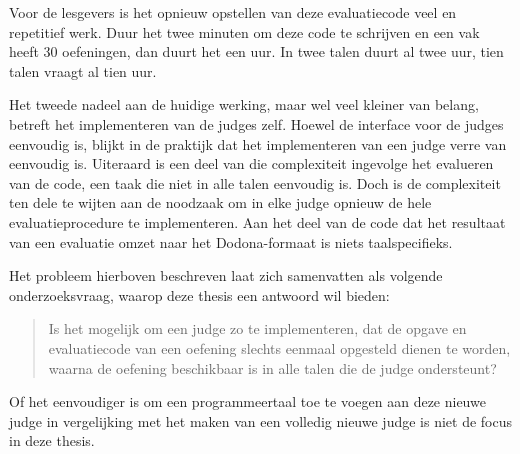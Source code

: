 Voor de lesgevers is het opnieuw opstellen van deze evaluatiecode veel en repetitief werk.
Duur het twee minuten om deze code te schrijven en een vak heeft 30 oefeningen, dan duurt het een uur.
In twee talen duurt al twee uur, tien talen vraagt al tien uur.

Het tweede nadeel aan de huidige werking, maar wel veel kleiner van belang, betreft het implementeren van de judges zelf.
Hoewel de interface voor de judges eenvoudig is, blijkt in de praktijk dat het implementeren van een judge verre van eenvoudig is.
Uiteraard is een deel van die complexiteit ingevolge het evalueren van de code, een taak die niet in alle talen eenvoudig is.
Doch is de complexiteit ten dele te wijten aan de noodzaak om in elke judge opnieuw de hele evaluatieprocedure te implementeren.
Aan het deel van de code dat het resultaat van een evaluatie omzet naar het Dodona-formaat is niets taalspecifieks.

Het probleem hierboven beschreven laat zich samenvatten als volgende onderzoeksvraag, waarop deze thesis een antwoord wil bieden:

\begin{quote}
    Is het mogelijk om een judge zo te implementeren, dat de opgave en evaluatiecode van een oefening slechts eenmaal opgesteld dienen te worden, waarna de oefening beschikbaar is in alle talen die de judge ondersteunt?
\end{quote}

Of het eenvoudiger is om een programmeertaal toe te voegen aan deze nieuwe judge in vergelijking met het maken van een volledig nieuwe judge is niet de focus in deze thesis.

